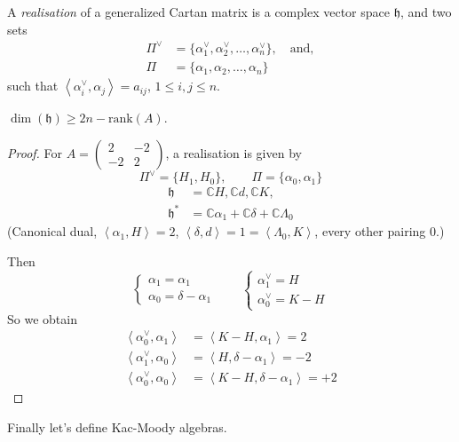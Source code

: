 \begin{definition}
\label{definition-realisation}
A {\it realisation} of a generalized Cartan matrix is a complex vector space
 $\mathfrak{h}$, and two sets
\begin{align*}
\Pi^\vee&=\{\alpha_1^\vee, \alpha_2^\vee,\ldots,\alpha_n^\vee\},\quad
\text{and},\\
\Pi&=\{\alpha_1,\alpha_2,\ldots,\alpha_n\}
\end{align*}
such that $\left<\alpha_i^\vee,\alpha_j\right>=a_{ij}$, $1\leq i,j\leq n$.
\end{definition}

\begin{exercise}
\label{exercise-realisation}
$\dim(\mathfrak{h})\geq 2n-\text{rank}(A)$.
\end{exercise}

\begin{proof}
For $A=\begin{pmatrix}
2&-2\\ 
-2&2
\end{pmatrix}$, a realisation is given by
$$
\Pi^\vee=\{H_1,H_0\},\qquad \Pi=\{\alpha_0,\alpha_1\}
$$
\begin{align*}
\mathfrak{h}&=\mathbb{C}H,\mathbb{C}d,\mathbb{C}K,\\
\mathfrak{h}^*&=\mathbb{C}\alpha_1+\mathbb{C}\delta+\mathbb{C}\Lambda_0
\end{align*}
(Canonical dual, $\left<\alpha_1,H\right>=2$, 
$\left<\delta,d\right>=1=\left<\Lambda_0,K\right>$, every other pairing $0$.)

Then
$$
\begin{cases}
\alpha_1=\alpha_1\\
\alpha_0=\delta-\alpha_1
\end{cases}\qquad 
\begin{cases}
\alpha_1^\vee=H \\
\alpha_0^\vee = K-H
\end{cases}
$$
So we obtain
\begin{align*}
\left<\alpha_0^\vee,\alpha_1\right>&=\left<K-H,\alpha_1\right>=2\\
\left<\alpha_1^\vee,\alpha_0\right>&=\left<H,\delta-\alpha_1\right>=-2\\
\left<\alpha_0^\vee,\alpha_0\right>&=\left<K-H,\delta-\alpha_1\right>=+2
\end{align*}

\end{proof}

\medskip\noindent
Finally let's define Kac-Moody algebras.

